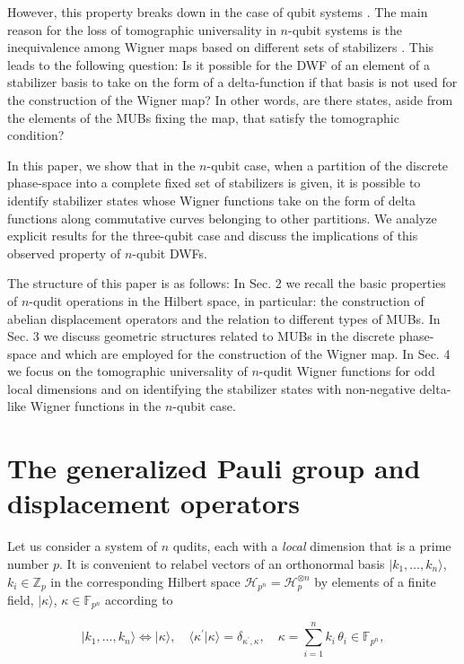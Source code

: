 \documentclass[quantumrep,article,submit,pdftex,moreauthors]{Definitions/mdpi}
\begin{document}
However, this property breaks down in the case of qubit systems \cite{UniqueWF,
cohomo,contextMagic}. The main reason for the loss of tomographic universality
in $n$-qubit systems is the inequivalence among Wigner maps based on different
sets of stabilizers \cite{Bjork2007, qip17}. This leads to the following
question: Is it possible for the DWF of an element of a stabilizer basis to take
on the form of a delta-function if that basis is not used for the construction
of the Wigner map? In other words, are there states, aside from the elements of
the MUBs fixing the map, that satisfy the tomographic condition?

In this paper, we show that in the $n$-qubit case, when a partition of the
discrete phase-space into a complete fixed set of stabilizers is given, it is
possible to identify stabilizer states whose Wigner functions take on the form
of delta functions along commutative curves belonging to other partitions. We
analyze explicit results for the three-qubit case and discuss the implications
of this observed property of $n$-qubit DWFs.

The structure of this paper is as follows: In Sec. 2 we recall the basic
properties of $n$-qudit operations in the Hilbert space, in particular: the
construction of abelian displacement operators and the relation to different
types of MUBs. In Sec. 3 we discuss geometric structures related to MUBs in the
discrete phase-space and which are employed for the construction of the Wigner
map. In Sec. 4 we focus on the tomographic universality of $n$-qudit Wigner
functions for odd local dimensions and on identifying the stabilizer states with
non-negative delta-like Wigner functions in the $n$-qubit case.


\section{The generalized Pauli group and displacement operators}

Let us consider a system of $n$ qudits, each with a \textit{local} dimension
that is a prime number $p$. It is convenient to relabel vectors of an
orthonormal basis $|k_{1},\ldots,k_{n}\rangle$, $k_{i} \in \mathbb{Z}_{p}$ in
the corresponding Hilbert space $\mathcal{H}_{p^{n}}=\mathcal{H}_{p}^{\otimes
n}$ by elements of a finite field, $|\kappa\rangle$, $\kappa \in
\mathbb{F}_{p^{n}}$ according to

\begin{equation}
  |k_{1},\ldots,k_{n}\rangle
  \Leftrightarrow |\kappa\rangle,
  \quad \langle\kappa^{\prime}|\kappa\rangle
  = \delta_{\kappa^{\prime},\kappa},
  \quad \kappa
  = \sum_{i=1}^{n} k_{i} \, \theta_{i} \in \mathbb{F}_{p^{n}},
  \label{basis}
\end{equation}
\end{document}
